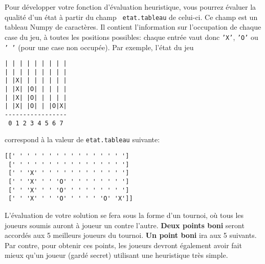 \documentclass{article}
\begin{document}
\begin{enumerate}[itemsep=20pt]
  Pour développer votre fonction d'évaluation heuristique, vous
  pourrez évaluer la qualité d'un état à partir du champ {\tt
    etat.tableau} de celui-ci. Ce champ est un tableau Numpy de
  caractères. Il contient l'information sur l'occupation de chaque
  case du jeu, à toutes les positions possibles: chaque entrée vaut
  donc {\tt 'X'}, {\tt 'O'} ou {\tt ' '} (pour une case
  non occupée). Par exemple, l'état du jeu
\begin{verbatim}
| | | | | | | | |
| | | | | | | | |
| |X| | | | | | |
| |X| |O| | | | |
| |X| |O| | | | |
| |X| |O| | |O|X|
-----------------
 0 1 2 3 4 5 6 7
\end{verbatim}
  correspond à la valeur de {\tt etat.tableau} suivante:
\begin{verbatim}
[[' ' ' ' ' ' ' ' ' ' ' ' ' ' ' ']
 [' ' ' ' ' ' ' ' ' ' ' ' ' ' ' ']
 [' ' 'X' ' ' ' ' ' ' ' ' ' ' ' ']
 [' ' 'X' ' ' 'O' ' ' ' ' ' ' ' ']
 [' ' 'X' ' ' 'O' ' ' ' ' ' ' ' ']
 [' ' 'X' ' ' 'O' ' ' ' ' 'O' 'X']]
\end{verbatim}

  L'évaluation de votre solution se fera sous la forme d'un tournoi,
  où tous les joueurs soumis auront à joueur un contre l'autre. {\bf Deux
  points boni} seront accordés aux 5 meilleurs joueurs du
  tournoi. {\bf Un point boni} ira aux 5 suivants. Par contre, pour obtenir
  ces points, les joueurs devront également avoir fait mieux qu'un
  joueur (gardé secret) utilisant une heuristique très simple.

\end{enumerate}
\end{document}
